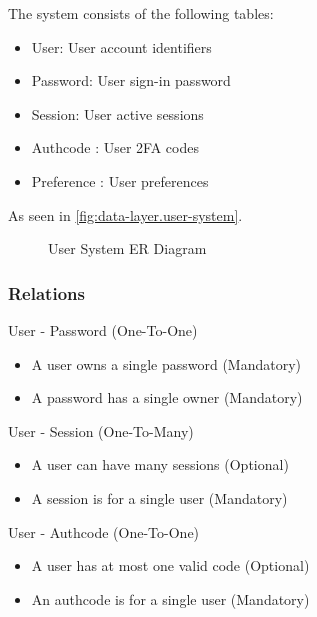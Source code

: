 The system consists of the following tables:

\begin{itemize}
	\item User: User account identifiers

	\item Password: User sign-in password

	\item Session: User active sessions

	\item Authcode \textdagger{}: User 2FA codes

	\item Preference \textdagger{}: User preferences
\end{itemize}

As seen in \autoref{fig:data-layer.user-system}.

\begin{figure}[h]
	\centering
	
	\caption{User System ER Diagram}
	\label{fig:data-layer.user-system}
\end{figure}

\subsubsection{Relations}
\label{data-layer.design.user.rels}

User - Password (One-To-One)
\begin{itemize}
	\item A user owns a single password (Mandatory)

	\item A password has a single owner (Mandatory)
\end{itemize}

User - Session (One-To-Many)
\begin{itemize}
	\item A user can have many sessions (Optional)

	\item A session is for a single user (Mandatory)
\end{itemize}

User - Authcode (One-To-One) \textdagger{}
\begin{itemize}
	\item A user has at most one valid code (Optional)

	\item An authcode is for a single user (Mandatory)
\end{itemize}


